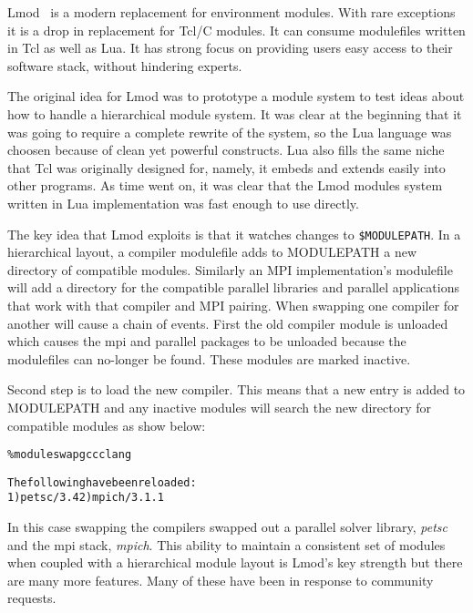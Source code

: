 Lmod~\cite{laytonLmod,taccSecretSauce,taccLmod} is a modern
replacement for environment modules.  With rare exceptions it is a
drop in replacement for Tcl/C modules. It can consume modulefiles
written in Tcl as well as Lua\cite{LuaBook}.  It has strong focus on
providing users easy access to their software stack, without hindering
experts.  

The original idea for Lmod was to prototype a module system to test
ideas about how to handle a hierarchical module system.  It was clear
at the beginning that it was going to require a complete rewrite of
the system, so the Lua language was choosen because of clean yet
powerful constructs.  Lua also fills the same niche that Tcl was
originally designed for, namely, it embeds and extends easily into
other programs.  As time went on, it was clear that the Lmod modules
system written in Lua implementation was fast enough to use directly.  


The key idea that Lmod exploits is that it watches changes to
\texttt{\$MODULEPATH}.  In a hierarchical layout, a compiler modulefile adds to
MODULEPATH a new directory of compatible modules.  Similarly an MPI
implementation's modulefile will add a directory for the compatible
parallel libraries and parallel applications that work with that
compiler and MPI pairing.  When swapping one compiler for another will
cause a chain of events.  First the old compiler module is unloaded
which causes the mpi and parallel packages to be unloaded because the
modulefiles can no-longer be found.  These modules are marked
inactive.

Second step is to load the new compiler.  This means that a new entry
is added to MODULEPATH and any inactive modules will search the new
directory for compatible modules as show below:
{\small
  \begin{alltt}
    \% module swap gcc clang

    The following have been reloaded:
    1) petsc/3.4  2) mpich/3.1.1
      
\end{alltt}
}
\noindent
In this case swapping the compilers swapped out a parallel solver
library, \emph{petsc} and the mpi stack, \emph{mpich}. This ability
to maintain a consistent set of modules when coupled with a
hierarchical module layout is Lmod's key strength but there are many
more features.  Many of these have been in response to community
requests.  

